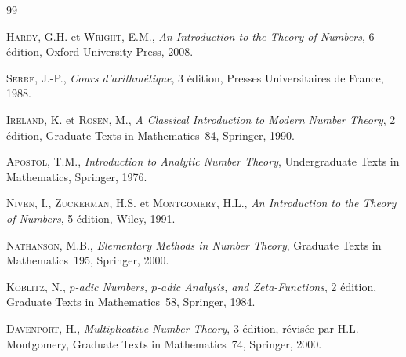 \documentclass[12pt,a4paper,openany]{book}
\theoremstyle{definition}
\theoremstyle{plain}
\theoremstyle{remark}
\begin{document}


\begin{thebibliography}{99}

\textsc{Hardy}, G.H. et \textsc{Wright}, E.M.,
\emph{An Introduction to the Theory of Numbers},
6\ieme{} édition,
Oxford University Press, 2008.

\textsc{Serre}, J.-P.,
\emph{Cours d'arithmétique},
3\ieme{} édition,
Presses Universitaires de France, 1988.

\textsc{Ireland}, K. et \textsc{Rosen}, M.,
\emph{A Classical Introduction to Modern Number Theory},
2\ieme{} édition,
Graduate Texts in Mathematics~84,
Springer, 1990.

\textsc{Apostol}, T.M.,
\emph{Introduction to Analytic Number Theory},
Undergraduate Texts in Mathematics,
Springer, 1976.

\textsc{Niven}, I., \textsc{Zuckerman}, H.S. et \textsc{Montgomery}, H.L.,
\emph{An Introduction to the Theory of Numbers},
5\ieme{} édition,
Wiley, 1991.

\textsc{Nathanson}, M.B.,
\emph{Elementary Methods in Number Theory},
Graduate Texts in Mathematics~195,
Springer, 2000.

\textsc{Koblitz}, N.,
\emph{$p$-adic Numbers, $p$-adic Analysis, and Zeta-Functions},
2\ieme{} édition,
Graduate Texts in Mathematics~58,
Springer, 1984.

\textsc{Davenport}, H.,
\emph{Multiplicative Number Theory},
3\ieme{} édition, révisée par H.L. Montgomery,
Graduate Texts in Mathematics~74,
Springer, 2000.

\end{thebibliography}

\printindex
\end{document}
